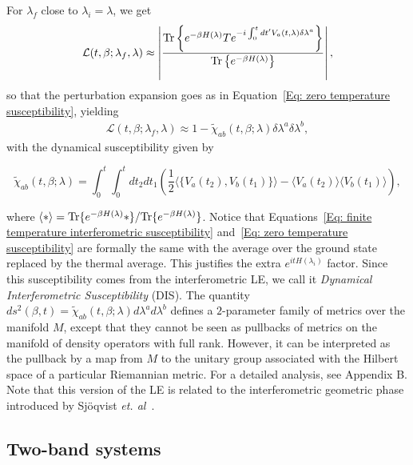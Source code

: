 For $\lambda_f$ close to $\lambda_i=\lambda$, we get
\begin{eqnarray}
\mathcal{L}(t,\beta ;\lambda_f,\lambda)\approx \left|\frac{\text{Tr}\left\{e^{-\beta H(\lambda)} T e^{-i \int_{0}^{t} dt' V_{a}(t,\lambda) \delta \lambda^a}\right\}}{\text{Tr} \left\{e^{-\beta H(\lambda)}\right\}}\right|,
\end{eqnarray}
so that the perturbation expansion goes as in Equation~\eqref{Eq: zero temperature susceptibility}, yielding
\begin{eqnarray}
\mathcal{L}(t,\beta ;\lambda_f,\lambda)\approx 1 -\tilde\chi_{ab}(t,\beta ;\lambda)\delta \lambda^a \delta \lambda^b,
\end{eqnarray}
with the dynamical susceptibility given by
\begin{small}
\begin{equation}
\tilde{\chi}_{ab}(t,\beta;\lambda)=
\int_{0}^{t}\int_{0}^{t} dt_2dt_1  \left(\frac{1}{2}\langle \{V_{a}(t_2),V_{b}(t_1)\} \rangle-\langle V_{a}(t_2)\rangle \langle V_{b}(t_1) \rangle\right),
\label{Eq: finite temperature interferometric susceptibility}
\end{equation}
\end{small}where $\langle \ast\rangle=\text{Tr}\{e^{-\beta H(\lambda)}\ast\}/\text{Tr}\{e^{-\beta H(\lambda)}\}$. Notice that Equations~\eqref{Eq: finite temperature interferometric susceptibility} and~\eqref{Eq: zero temperature susceptibility} are formally the same with the average over the ground state replaced by the thermal average. This justifies the extra $e^{it H(\lambda_i)}$ factor. Since this susceptibility comes from the interferometric LE, we call it \emph{Dynamical  Interferometric Susceptibility} (DIS). The quantity $ds^2(\beta,t)=\tilde{\chi}_{ab}(t,\beta;\lambda)d\lambda^ad\lambda^b$ defines a $2$-parameter family of metrics over the manifold $M$, except that they cannot be seen as pullbacks of metrics on the manifold of density operators with full rank. However, it can be interpreted as the pullback by a map from $M$ to the unitary group associated with the Hilbert space of a particular Riemannian metric. For a detailed analysis, see Appendix B. Note that this version of the LE is related to the interferometric geometric phase introduced by Sj\"{o}qvist \emph{ et. al}~\cite{sjo:pat:eke:ana:eri:oi:ved:00,ton:sjo:kwe:oh}. \\

\subsection{Two-band systems}

